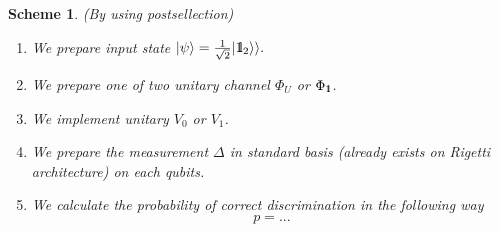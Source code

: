 \documentclass[11pt,a4paper,reqno, oneside]{amsart}
\newcommand{\ket}[1]{\ensuremath{|#1\rangle}}
\newcommand{\1}{{\rm 1\hspace{-0.9mm}l}}
\newcommand{\Id}{{\rm 1\hspace{-0.9mm}l}}
\newtheorem{scheme}{Scheme}
\begin{document}
\newpage
\begin{scheme}(By using postsellection)

\begin{enumerate}
\item We prepare input state $\ket{\psi} = \frac{1}{\sqrt{2} } | \Id_2 \rangle 
\rangle. $
\item We prepare one of two unitary channel $\Phi_{U} $ or $\Phi_{\1}$. 
\item We implement unitary $V_0 $ or $ V_1$.
\item We prepare the measurement $\Delta$ in standard basis (already exists on 
Rigetti architecture) on each qubits.
\item We calculate the probability of correct discrimination in the following 
way
\begin{equation}
p = ...
\end{equation}
\end{enumerate}
\end{scheme}
\end{document}
